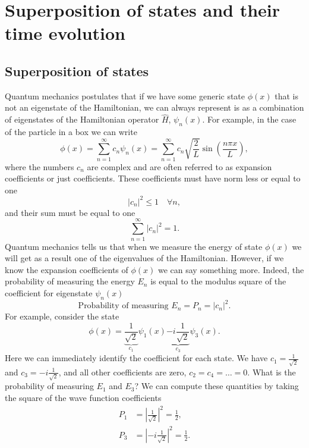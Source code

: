 \documentclass[../Main/chem331-notes.tex]{subfiles}
\begin{document}
\setcounter{section}{7}

\section{Superposition of states and their time evolution}
\subsection{Superposition of states}
Quantum mechanics postulates that if we have some generic state $\phi(x)$ that is not an eigenstate of the Hamiltonian, we can always represent is as a combination of eigenstates of the Hamiltonian operator $\hat{H}$, $\psi_n(x)$. For example, in the case of the particle in a box we can write
\begin{equation}
\label{eq:super:superposition}
\phi(x) = \sum_{n = 1}^\infty c_n \psi_n(x) = \sum_{n = 1}^\infty c_n \sqrt{\frac{2}{L}} \sin\left(\frac{n \pi x}{L}\right),
\end{equation}
where the numbers $c_n$ are complex and are often referred to as expansion coefficients or just coefficients.
These coefficients must have norm less or equal to one
\begin{equation}
|c_n|^2 \leq 1 \quad \forall n,
\end{equation}
and their sum must be equal to one
\begin{equation}
\sum_{n = 1}^\infty |c_n|^2 = 1.
\end{equation}
Quantum mechanics tells us that when we measure the energy of state $\phi(x)$ we will get as a result one of the eigenvalues of the Hamiltonian.
However, if we know the expansion coefficients of $\phi(x)$ we can say something more.
Indeed, the probability of measuring the energy $E_n$ is equal to the modulus square of the coefficient for eigenstate $\psi_n(x)$
\begin{equation}
\text{Probability of measuring } E_n = P_n = |c_n|^2.
\end{equation}
For example, consider the state
\begin{equation}
\phi(x) = \underbrace{\frac{1}{\sqrt{2}}}_{c_1} \psi_1(x) \underbrace{- i \frac{1}{\sqrt{2}}}_{c_3} \psi_3(x).
\end{equation}
Here we can immediately identify the coefficient for each state. We have $c_1 = \frac{1}{\sqrt{2}}$ and $c_3 = - i \frac{1}{\sqrt{2}}$, and all other coefficients are zero, $c_2 = c_4 = \ldots = 0$.
What is the probability of measuring $E_1$ and $E_3$? We can compute these quantities by taking the square of the wave function coefficients
\begin{equation}
\begin{split}
P_1 &= \left|\frac{1}{\sqrt{2}}\right|^2 = \frac{1}{2},\\
P_3 &= \left|-i\frac{1}{\sqrt{2}}\right|^2 = \frac{1}{2}.
\end{split}
\end{equation}
\end{document}
